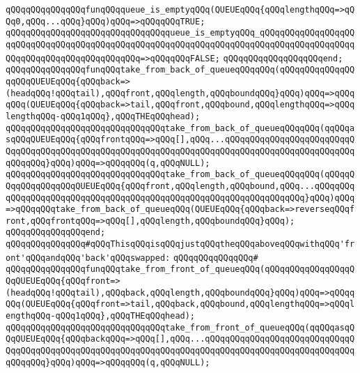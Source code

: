\newline
\newline
\verb|qQQqqQQqqQQqqQQqfunqQQqqueue_is_emptyqQQq(QUEUEqQQq{qQQqlengthqQQq=>qQQq0,qQQq...qQQq}qQQq)qQQq=>qQQqqQQqTRUE;|\newline
\verb|qQQqqQQqqQQqqQQqqQQqqQQqqQQqqQQqqueue_is_emptyqQQq_qQQqqQQqqQQqqQQqqQQqqQQqqQQqqQQqqQQqqQQqqQQqqQQqqQQqqQQqqQQqqQQqqQQqqQQqqQQqqQQqqQQqqQQqqQQqqQQqqQQqqQQqqQQqqQQqqQQq=>qQQqqQQqFALSE;|\newline
\verb|qQQqqQQqqQQqqQQqqQQqend;|\newline
\newline
\newline
\verb|qQQqqQQqqQQqqQQqfunqQQqtake_from_back_of_queueqQQqqQQq(qQQqqQQqqQQqqQQqqQQqQUEUEqQQq{qQQqback=>(headqQQq!qQQqtail),qQQqfront,qQQqlength,qQQqboundqQQq}qQQq)qQQq=>qQQqqQQq(QUEUEqQQq{qQQqback=>tail,qQQqfront,qQQqbound,qQQqlengthqQQq=>qQQqlengthqQQq-qQQq1qQQq},qQQqTHEqQQqhead);|\newline
\verb|qQQqqQQqqQQqqQQqqQQqqQQqqQQqqQQqtake_from_back_of_queueqQQqqQQq(qqQQqasqQQqQUEUEqQQq{qQQqfrontqQQq=>qQQq[],qQQq...qQQqqQQqqQQqqQQqqQQqqQQqqQQqqQQqqQQqqQQqqQQqqQQqqQQqqQQqqQQqqQQqqQQqqQQqqQQqqQQqqQQqqQQqqQQqqQQqqQQqqQQq}qQQq)qQQq=>qQQqqQQq(q,qQQqNULL);|\newline
\verb|qQQqqQQqqQQqqQQqqQQqqQQqqQQqqQQqtake_from_back_of_queueqQQqqQQq(qQQqqQQqqQQqqQQqqQQqQUEUEqQQq{qQQqfront,qQQqlength,qQQqbound,qQQq...qQQqqQQqqQQqqQQqqQQqqQQqqQQqqQQqqQQqqQQqqQQqqQQqqQQqqQQqqQQqqQQqqQQq}qQQq)qQQq=>qQQqqQQqtake_from_back_of_queueqQQq(QUEUEqQQq{qQQqback=>reverseqQQqfront,qQQqfrontqQQq=>qQQq[],qQQqlength,qQQqboundqQQq}qQQq);|\newline
\verb|qQQqqQQqqQQqqQQqend;|\newline
\newline
\verb|qQQqqQQqqQQqqQQq#qQQqThisqQQqisqQQqjustqQQqtheqQQqaboveqQQqwithqQQq'front'qQQqandqQQq'back'qQQqswapped:|\newline
\verb|qQQqqQQqqQQqqQQq#|\newline
\verb|qQQqqQQqqQQqqQQqfunqQQqtake_from_front_of_queueqQQq(qQQqqQQqqQQqqQQqqQQqQUEUEqQQq{qQQqfront=>(headqQQq!qQQqtail),qQQqback,qQQqlength,qQQqboundqQQq}qQQq)qQQq=>qQQqqQQq(QUEUEqQQq{qQQqfront=>tail,qQQqback,qQQqbound,qQQqlengthqQQq=>qQQqlengthqQQq-qQQq1qQQq},qQQqTHEqQQqhead);|\newline
\verb|qQQqqQQqqQQqqQQqqQQqqQQqqQQqqQQqtake_from_front_of_queueqQQq(qqQQqasqQQqQUEUEqQQq{qQQqbackqQQq=>qQQq[],qQQq...qQQqqQQqqQQqqQQqqQQqqQQqqQQqqQQqqQQqqQQqqQQqqQQqqQQqqQQqqQQqqQQqqQQqqQQqqQQqqQQqqQQqqQQqqQQqqQQqqQQqqQQqqQQq}qQQq)qQQq=>qQQqqQQq(q,qQQqNULL);|\newline
